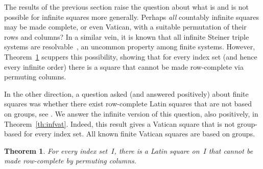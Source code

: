 \documentclass[12pt,a4paper]{article}
\newtheorem{thm}{Theorem}[section]
\begin{document}
The results of the previous section raise the question about what is and is not possible for infinite squares more generally.   Perhaps {\em all} countably infinite squares may be made complete, or even Vatican, with a suitable permutation of their rows and columns?   In a similar vein, it is known that all infinite Steiner triple systems are resolvable~\cite{DHW14}, an uncommon property among finite systems. However, Theorem~\ref{th:notrcls} scuppers this possibility, showing that for every index set (and hence every infinite order) there is a square that cannot be made row-complete via permuting columns.

In the other direction, a question asked (and answered positively) about finite squares was whether there exist row-complete Latin squares that are not based on groups, see \cite{CE91, DK15, Owens76}.  We answer the infinite version of this question, also positively, in Theorem~\ref{th:infvat}.  Indeed, this result gives a Vatican square that is not group-based for every index set.   All known finite Vatican squares are based on groups.

\begin{thm}\label{th:notrcls}
For every index set~$I$, there is a Latin square on~$I$ that cannot be made row-complete by permuting columns.
\end{thm}
\end{document}
